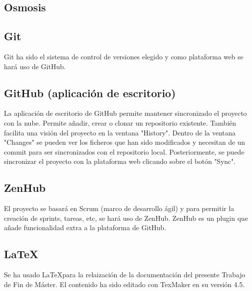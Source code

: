 \subsection{Osmosis}


\subsection{Git}
Git ha sido el sistema de control de versiones elegido y como plataforma web se hará uso de GitHub.

\subsection{GitHub (aplicación de escritorio)}
La aplicación de escritorio de GitHub permite mantener sincronizado el proyecto con la nube. Permite añadir, crear o clonar un repositorio existente. También facilita una visión del proyecto en la ventana "History". Dentro de la ventana "Changes" se pueden ver los ficheros que han sido modificados y necesitan de un commit para ser sincronizados con el repositorio local. Posteriormente, se puede sincronizar el proyecto con la plataforma web clicando sobre el botón "Sync".

\subsection{ZenHub}
El proyecto se basará en Scrum (marco de desarrollo ágil) y para permitir la creación de sprints, tareas, etc, se hará uso de ZenHub.
ZenHub es un plugin que añade funcionalidad extra a la plataforma de GitHub.

\subsection{\LaTeX}
Se ha usado \LaTeX  para la relaización de la documentación del presente Trabajo de Fin de Máster. El contenido ha sido editado con TexMaker en su versión 4.5.